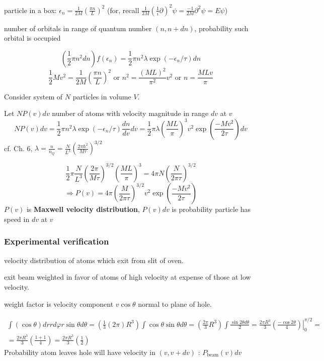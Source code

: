 \documentclass[10pt]{amsart}
\begin{document}
\begin{multicols*}{2}
particle in a box: $\epsilon_n = \frac{1}{2M} \left( \frac{\pi n}{L} \right)^2 $ (for, recall $\frac{1}{2M} \left( \frac{1}{i} \partial \right)^2 \psi = \frac{-1}{2M} \partial^2 \psi = E \psi$)

number of orbitals in range of quantum number $(n,n+dn)$, probability such orbital is occupied

\[
(\frac{1}{2} \pi n^2 dn)f(\epsilon_n) = \frac{1}{2} \pi n^2 \lambda \exp{ (-\epsilon_n/\tau) } dn
\]
\[
\frac{1}{2} Mv^2 = \frac{1}{2M} \left( \frac{ \pi n}{ L } \right)^2 \text{ or } n^2 = \frac{ (ML)^2 }{ \pi^2} v^2 \text{ or } n = \frac{MLv}{\pi}
\]

Consider system of $N$ particles in volume $V$.  

Let $NP(v) dv$ number of atoms with velocity magnitude in range $dv$ at $v$
\[
NP(v) dv = \frac{1}{2} \pi n^2 \lambda \exp{ ( -\epsilon_n /\tau)} \frac{dn}{dv} dv = \frac{1}{2} \pi \lambda \left( \frac{ ML }{ \pi } \right)^3 v^2 \exp{ \left( \frac{ -Mv^2 }{2\tau } \right) }dv
\]
cf. Ch. 6, $\lambda = \frac{n}{n_Q} = \frac{N}{L^3} \left( \frac{ 2\pi \hbar^2 }{ M \tau } \right)^{3/2}$

\[
\frac{1}{2} \pi \frac{N}{L^3} \left( \frac{2\pi }{ M \tau} \right)^{3/2} \left( \frac{ ML }{\pi } \right)^3 = 4\pi N \left( \frac{N}{2\pi \tau} \right)^{3/2}
\]
\begin{equation}
\Longrightarrow P(v) = 4\pi \left( \frac{M}{2\pi \tau } \right)^{3/2} v^2 \exp{ \left( \frac{- Mv^2}{ 2\tau } \right) } 
\end{equation}
$P(v)$ is \textbf{Maxwell velocity distribution}, $P(v)dv$ is probability particle has speed in $dv$ at $v$

\subsubsection*{Experimental verification}

velocity distribution of atoms which exit from slit of oven.  

exit beam weighted in favor of atoms of high velocity at expense of those at low velocity. 

weight factor is velocity component $v\cos{\theta}$ normal to plane of hole. 

\[
\begin{gathered}
  \int (\cos{\theta}) dr rd\varphi r \sin{\theta} d\theta = (\frac{1}{3} (2\pi ) R^3) \int \cos{\theta} \sin{\theta} d\theta = ( \frac{2\pi}{3} R^3) \int \frac{\sin{2\theta} d\theta}{ 2 } = \frac{2\pi R^3}{3} \left. \left( \frac{ - \cos{2\theta} }{4} \right) \right|_0^{\pi/2} = \\
  = \frac{ 2\pi R^3}{3} \left( \frac{1+ 1}{4} \right) = \frac{ 2\pi R^3}{3} \left( \frac{1}{2} \right)
\end{gathered}
\]
Probability atom leaves hole will have velocity in $(v,v+dv)$ : $P_{\text{beam}}(v) dv$


\end{multicols*}
\end{document}
